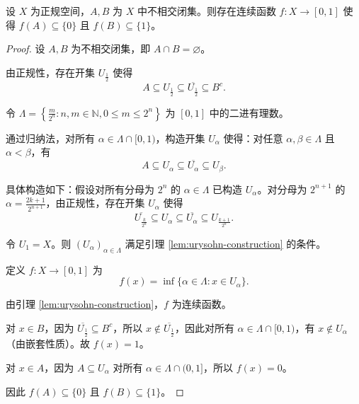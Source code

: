 \documentclass[lang=cn,a4paper,newtx,figureplace=section,tableplace=section]{elegantbook}
\begin{document}
\begin{theorem}[Urysohn 引理]\label{thm:urysohn-lemma}
设 $X$ 为正规空间，$A, B$ 为 $X$ 中不相交闭集。则存在连续函数 $f: X \to [0,1]$ 使得 $f(A) \subseteq \{0\}$ 且 $f(B) \subseteq \{1\}$。
\end{theorem}
\begin{proof}
设 $A, B$ 为不相交闭集，即 $A \cap B = \varnothing$。

由正规性，存在开集 $U_{\frac{1}{2}}$ 使得 
\begin{equation}
A \subseteq U_{\frac{1}{2}} \subseteq \overline{U_{\frac{1}{2}}} \subseteq B^c.
\end{equation}

令 $\Lambda = \left\{\frac{m}{2^n} : n, m \in \mathbb{N}, 0 \leq m \leq 2^n\right\}$ 为 $[0,1]$ 中的二进有理数。

通过归纳法，对所有 $\alpha \in \Lambda \cap [0,1)$，构造开集 $U_\alpha$ 使得：对任意 $\alpha, \beta \in \Lambda$ 且 $\alpha < \beta$，有
\begin{equation}
A \subseteq U_\alpha \subseteq \overline{U_\alpha} \subseteq U_\beta.
\end{equation}

具体构造如下：假设对所有分母为 $2^n$ 的 $\alpha \in \Lambda$ 已构造 $U_\alpha$。对分母为 $2^{n+1}$ 的 $\alpha = \frac{2k+1}{2^{n+1}}$，由正规性，存在开集 $U_\alpha$ 使得
\begin{equation}
\overline{U_{\frac{k}{2^n}}} \subseteq U_\alpha \subseteq \overline{U_\alpha} \subseteq U_{\frac{k+1}{2^n}}.
\end{equation}

令 $U_1 = X$。则 $(U_\alpha)_{\alpha \in \Lambda}$ 满足引理 \ref{lem:urysohn-construction} 的条件。

定义 $f: X \to [0,1]$ 为
\begin{equation}
f(x) = \inf\{\alpha \in \Lambda : x \in U_\alpha\}.
\end{equation}

由引理 \ref{lem:urysohn-construction}，$f$ 为连续函数。

对 $x \in B$，因为 $\overline{U_{\frac{1}{2}}} \subseteq B^c$，所以 $x \notin \overline{U_{\frac{1}{2}}}$，因此对所有 $\alpha \in \Lambda \cap [0,1)$，有 $x \notin U_\alpha$（由嵌套性质）。故 $f(x) = 1$。

对 $x \in A$，因为 $A \subseteq U_\alpha$ 对所有 $\alpha \in \Lambda \cap (0,1]$，所以 $f(x) = 0$。

因此 $f(A) \subseteq \{0\}$ 且 $f(B) \subseteq \{1\}$。
\end{proof}
\end{document}
